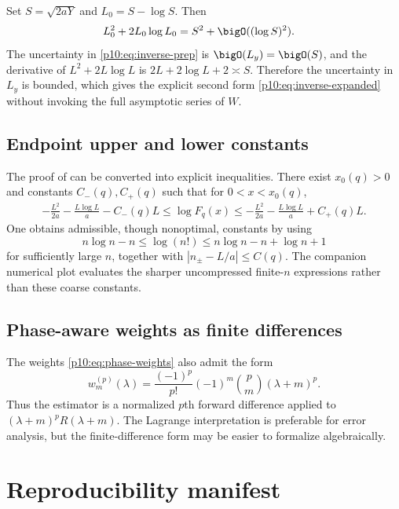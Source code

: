 \documentclass[11pt]{article}
\numberwithin{equation}{section}
\theoremstyle{definition}
\theoremstyle{remark}
\begin{document}
Set $S=\sqrt{2aY}$ and $L_0=S-\log S$.  Then
\begin{align*}
 L_0^2+2L_0\log L_0
 &=S^2+\bigO((\log S)^2).
\end{align*}
The uncertainty in \eqref{p10:eq:inverse-prep} is $\bigO(L_y)=\bigO(S)$, and the derivative of
$L^2+2L\log L$ is $2L+2\log L+2\asymp S$.  Therefore the uncertainty in $L_y$ is bounded,
which gives the explicit second form \eqref{p10:eq:inverse-expanded} without invoking the full
asymptotic series of $W$.

\subsection{Endpoint upper and lower constants}

The proof of  can be converted into explicit inequalities.  There exist
$x_0(q)>0$ and constants $C_-(q),C_+(q)$ such that for $0<x<x_0(q)$,
\begin{align*}
 -\frac{L^2}{2a}-\frac{L\log L}{a}-C_-(q)L
 \le\log F_q(x)
 \le-\frac{L^2}{2a}-\frac{L\log L}{a}+C_+(q)L.
\end{align*}
One obtains admissible, though nonoptimal, constants by using
\[
 n\log n-n\le\log(n!)\le n\log n-n+\log n+1
\]
for sufficiently large $n$, together with
$|n_\pm-L/a|\le C(q)$.  The companion numerical plot evaluates the sharper uncompressed
finite-$n$ expressions rather than these coarse constants.

\subsection{Phase-aware weights as finite differences}

The weights \eqref{p10:eq:phase-weights} also admit the form
\[
 w_m^{(p)}(\lambda)
 =\frac{(-1)^p}{p!}(-1)^m\binom pm(\lambda+m)^p.
\]
Thus the estimator is a normalized $p$th forward difference applied to
$(\lambda+m)^pR(\lambda+m)$.  The Lagrange interpretation is preferable for error analysis,
but the finite-difference form may be easier to formalize algebraically.

\section{Reproducibility manifest}
\label{p10:app:manifest}
\end{document}
